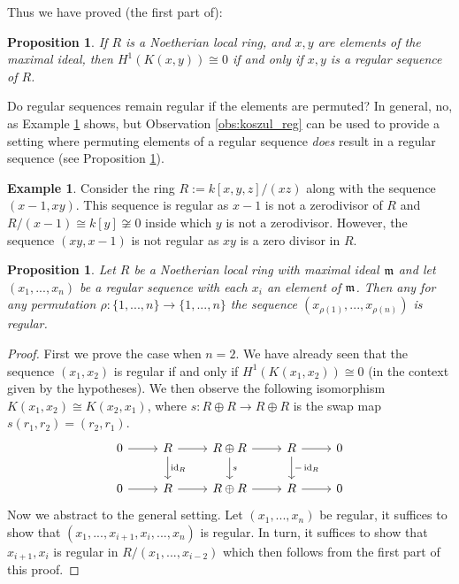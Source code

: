 \documentclass[12pt]{article}
\theoremstyle{plain}
\newtheorem{proposition}[thm]{Proposition}
\theoremstyle{definition}
\newtheorem{example}[thm]{Example}
\newcommand{\lto}{\longrightarrow}
\begin{document}
Thus we have proved (the first part of):
\begin{proposition}\label{prop:Zero_KozHom_reg}
	If $R$ is a Noetherian local ring, and $x,y$ are elements of the maximal ideal, then $H^1(K(x,y)) \cong 0$ if and only if $x,y$ is a regular sequence of $R$.
\end{proposition}
Do regular sequences remain regular if the elements are permuted? In general, no, as Example \ref{ex:permute_reg} shows, but Observation \ref{obs:koszul_reg} can be used to provide a setting where permuting elements of a regular sequence \emph{does} result in a regular sequence (see Proposition \ref{prop:reg_permute}).
\begin{example}\label{ex:permute_reg}
	Consider the ring $R := k[x,y,z]/(xz)$ along with the sequence $(x-1,xy)$. This sequence is regular as $x-1$ is not a zerodivisor of $R$ and $R/(x-1) \cong k[y] \not\cong 0$ inside which $y$ is not a zerodivisor. However, the sequence $(xy, x-1)$ is not regular as $xy$ is a zero divisor in $R$.
\end{example}
\begin{proposition}\label{prop:reg_permute}
	Let $R$ be a Noetherian local ring with maximal ideal $\frak{m}$ and let $(x_1,...,x_n)$ be a regular sequence with each $x_i$ an element of $\frak{m}$. Then any for any permutation $\rho: \lbrace 1,...,n \rbrace \lto \lbrace 1,...,n \rbrace$ the sequence $(x_{\rho(1)},...,x_{\rho(n)})$ is regular.
\end{proposition}
\begin{proof}
	First we prove the case when $n = 2$. We have already seen that the sequence $(x_1,x_2)$ is regular if and only if $H^1(K(x_1,x_2)) \cong 0$ (in the context given by the hypotheses). We then observe the following isomorphism $K(x_1,x_2) \cong K(x_2,x_1)$, where $s: R \oplus R \lto R \oplus R$ is the swap map $s(r_1,r_2) = (r_2,r_1)$.
	\begin{equation}
		\begin{tikzcd}
			0\arrow[r] & R\arrow[r]\arrow[d,"{\operatorname{id}_R}"] & R \oplus R\arrow[r]\arrow[d,"s"] & R\arrow[r]\arrow[d,"{-\operatorname{id}_R}"] & 0\\
			0\arrow[r] & R\arrow[r] & R \oplus R\arrow[r] & R\arrow[r] & 0
		\end{tikzcd}
	\end{equation}
	Now we abstract to the general setting. Let $(x_1,...,x_n)$ be regular, it suffices to show that $(x_1,...,x_{i+1},x_i,..., x_n)$ is regular. In turn, it suffices to show that $x_{i+1},x_i$ is regular in $R/(x_1,...,x_{i-2})$ which then follows from the first part of this proof.
\end{proof}
\end{document}
